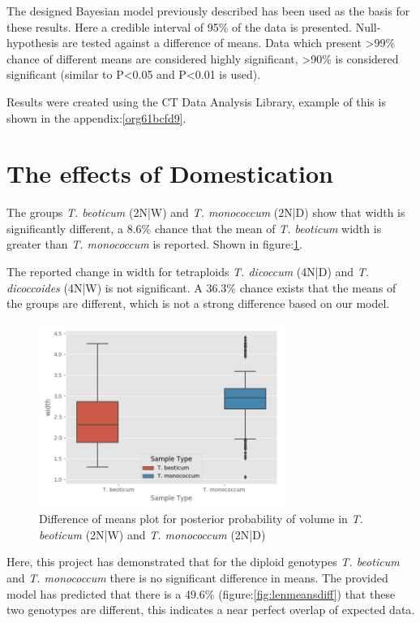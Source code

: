 \documentclass[11pt]{report}
\begin{document}
The designed Bayesian model previously described has been used as the basis for these results. Here a credible interval of 95\% of the data is presented. Null-hypothesis are tested against a difference of means. Data which present >99\% chance of different means are considered highly significant, >90\% is considered significant (similar to P<0.05 and P<0.01 is used).

Results were created using the CT Data Analysis Library, example of this is shown in the appendix:\ref{org61bcfd9}.

\clearpage
\section{The effects of Domestication}
\label{sec:org19d985b}
The groups \emph{T. beoticum} (2N|W) and \emph{T. monococcum} (2N|D) show that width is significantly different, a 8.6\% chance that the mean of \emph{T. beoticum} width is greater than \emph{T. monococcum} is reported. Shown in figure:\ref{fig:orge72cc5f}.

The reported change in width for tetraploids \emph{T. dicoccum} (4N|D) and \emph{T. dicoccoides} (4N|W) is not significant. A 36.3\% chance exists that the means of the groups are different, which is not a strong difference based on our model.

\begin{figure}[htbp]
\centering
\includegraphics[width=8cm]{./images/results/group1/width.png}
\caption{\label{fig:orge72cc5f}
Difference of means plot for posterior probability of volume in \emph{T. beoticum} (2N|W) and \emph{T. monococcum} (2N|D)}
\end{figure}


Here, this project has demonstrated that for the diploid genotypes \emph{T. beoticum} and \emph{T. monococcum} there is no significant difference in means. The provided model has predicted that there is a 49.6\% (figure:\ref{fig:lenmeansdiff}) that these two genotypes are different, this indicates a near perfect overlap of expected data.
\end{document}

